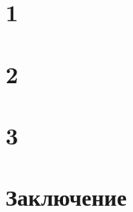 \documentclass[a4paper,12pt]{article}
\begin{document}
\section{1}
\section{2}
\section{3}
\section{Заключение}
\clearpage
\printbibliography
\end{document}
